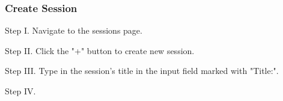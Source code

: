 \subsubsection{Create Session}
\begin{userManualItemlist}
	\item[Step I.] Navigate to the sessions page.
	\item[Step II.] Click the "+" button to create new session.
	\item[Step III.] Type in the session's title in the input field marked with "Title:".
	\item[Step IV.] 
\end{userManualItemlist}